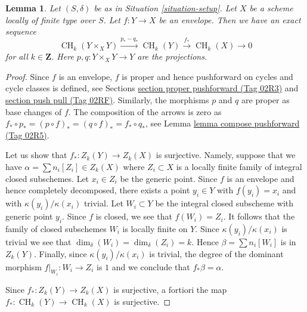 \documentclass{amsart}
\theoremstyle{plain}
\newtheorem{lemma}[subsection]{Lemma}
\theoremstyle{definition}
\theoremstyle{remark}
\numberwithin{equation}{subsection}
\def\CH{\mathop{\mathrm{CH}}\nolimits}
\begin{document}
\begin{lemma}
\label{lemma-envelope}
Let $(S, \delta)$ be as in Situation \ref{situation-setup}.
Let $X$ be a scheme locally of finite type over $S$.
Let $f : Y \to X$ be an envelope. Then
we have an exact sequence
$$
\CH_k(Y \times_X Y) \xrightarrow{p_* - q_*}
\CH_k(Y) \xrightarrow{f_*}
\CH_k(X) \to 0
$$
for all $k \in \mathbf{Z}$. Here $p, q : Y \times_X Y \to Y$ are
the projections.
\end{lemma}

\begin{proof}
Since $f$ is an envelope, $f$ is proper and hence pushforward on
cycles and cycle classes is defined, see
Sections \href{https://stacks.math.columbia.edu/tag/02R3}{section proper pushforward (Tag 02R3)} and \href{https://stacks.math.columbia.edu/tag/02RF}{section push pull (Tag 02RF)}.
Similarly, the morphisms $p$ and $q$ are proper as base changes of $f$.
The composition of the arrows is zero as
$f_* \circ p_* = (p \circ f)_* = (q \circ f)_* = f_* \circ q_*$, see
Lemma \href{https://stacks.math.columbia.edu/tag/02R5}{lemma compose pushforward (Tag 02R5)}.

\medskip\noindent
Let us show that $f_* : Z_k(Y) \to Z_k(X)$ is surjective.
Namely, suppose that we have $\alpha = \sum n_i[Z_i] \in Z_k(X)$
where $Z_i \subset X$ is a locally finite family of integral
closed subschemes. Let $x_i \in Z_i$ be the generic point.
Since $f$ is an envelope and hence completely decomposed,
there exists a point $y_i \in Y$ with $f(y_i) = x_i$
and with $\kappa(y_i)/\kappa(x_i)$ trivial. Let $W_i \subset Y$
be the integral closed subscheme with generic point $y_i$.
Since $f$ is closed, we see that $f(W_i) = Z_i$.
It follows that the family of closed subschemes $W_i$ is locally finite
on $Y$. Since $\kappa(y_i)/\kappa(x_i)$ is trivial we see
that $\dim_\delta(W_i) = \dim_\delta(Z_i) = k$. Hence
$\beta = \sum n_i[W_i]$ is in $Z_k(Y)$. Finally, since
$\kappa(y_i)/\kappa(x_i)$ is trivial, the degree of the dominant
morphism $f|_{W_i} : W_i \to Z_i$ is $1$ and we conclude
that $f_*\beta = \alpha$.

\medskip\noindent
Since $f_* : Z_k(Y) \to Z_k(X)$ is surjective, a fortiori the map
$f_* : \CH_k(Y) \to \CH_k(X)$ is surjective.


\end{proof}
\end{document}
